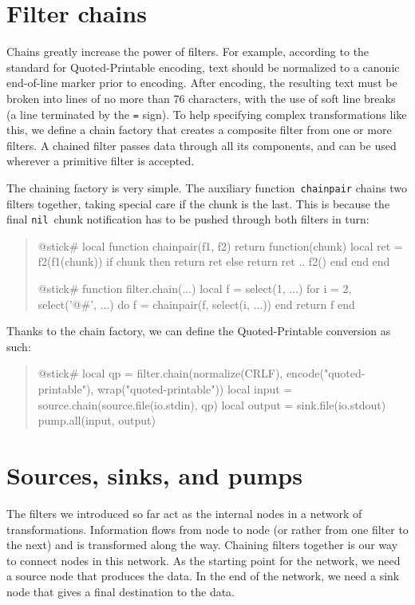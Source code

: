 \documentclass[10pt]{article}
\newcommand{\nil}{\texttt{nil}}
\begin{document}
\section{Filter chains}

Chains greatly increase the power of filters.  For example,
according to the standard for Quoted-Printable encoding,
text should be normalized to a canonic end-of-line marker
prior to encoding.  After encoding, the resulting text must
be broken into lines of no more than 76 characters, with the
use of soft line breaks (a line terminated by the \texttt{=}
sign).  To help specifying complex transformations like
this, we define a chain factory that creates a composite
filter from one or more filters.  A chained filter passes
data through all its components, and can be used wherever a
primitive filter is accepted.

The chaining factory is very simple. The auxiliary
function~\texttt{chainpair} chains two filters together,
taking special care if the chunk is the last.  This is
because the final \nil\ chunk notification has to be
pushed through both filters in turn:
\begin{quote}
\begin{lua}
@stick#
local function chainpair(f1, f2)
  return function(chunk)
    local ret = f2(f1(chunk))
    if chunk then return ret
    else return ret .. f2() end
  end
end
%

@stick#
function filter.chain(...)
  local f = select(1, ...)
  for i = 2, select('@#', ...) do
    f = chainpair(f, select(i, ...))
  end
  return f
end
%
\end{lua}
\end{quote}

Thanks to the chain factory, we can
define the Quoted-Printable conversion as such:
\begin{quote}
\begin{lua}
@stick#
local qp = filter.chain(normalize(CRLF), encode("quoted-printable"),
  wrap("quoted-printable"))
local input = source.chain(source.file(io.stdin), qp)
local output = sink.file(io.stdout)
pump.all(input, output)
%
\end{lua}
\end{quote}

\section{Sources, sinks, and pumps}

The filters we introduced so far act as the internal nodes
in a network of transformations. Information flows from node
to node (or rather from one filter to the next) and is
transformed along the way. Chaining filters together is our
way to connect nodes in this network. As the starting point
for the network, we need a source node that produces the
data. In the end of the network, we need a sink node that
gives a final destination to the data.
\end{document}
